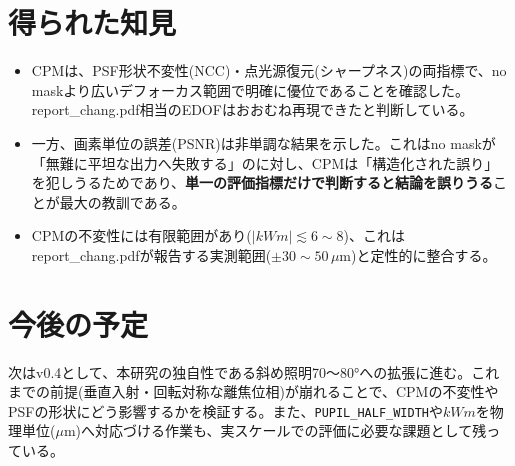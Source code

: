 \documentclass[11pt]{article}
\begin{document}
\section{得られた知見}
\begin{itemize}[topsep=2pt, itemsep=2pt]
  \item CPMは、PSF形状不変性(NCC)・点光源復元(シャープネス)の両指標で、no maskより広いデフォーカス範囲で明確に優位であることを確認した。report\_chang.pdf相当のEDOFはおおむね再現できたと判断している。
  \item 一方、画素単位の誤差(PSNR)は非単調な結果を示した。これはno maskが「無難に平坦な出力へ失敗する」のに対し、CPMは「構造化された誤り」を犯しうるためであり、\textbf{単一の評価指標だけで判断すると結論を誤りうる}ことが最大の教訓である。
  \item CPMの不変性には有限範囲があり($|kWm|\lesssim 6\sim8$)、これはreport\_chang.pdfが報告する実測範囲($\pm30\sim50\,\mu\text{m}$)と定性的に整合する。
\end{itemize}

\section{今後の予定}
次はv0.4として、本研究の独自性である斜め照明70〜80°への拡張に進む。これまでの前提(垂直入射・回転対称な離焦位相)が崩れることで、CPMの不変性やPSFの形状にどう影響するかを検証する。また、\texttt{PUPIL\_HALF\_WIDTH}や$kWm$を物理単位($\mu$m)へ対応づける作業も、実スケールでの評価に必要な課題として残っている。

\printbibliography
\end{document}
